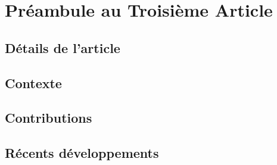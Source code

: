 \chapter{Pr\'{e}ambule au Troisi\`{e}me Article }

\section{D\'{e}tails de l'article}

\section{Contexte}

\section{Contributions}

\section{R\'{e}cents d\'{e}veloppements}

